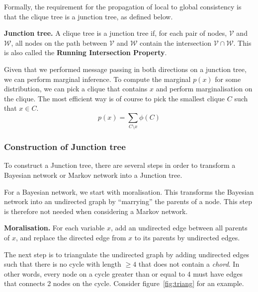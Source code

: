 \documentclass{article}
\begin{document}
Formally, the requirement for the propagation of local to global consistency is that the clique tree is a junction tree, as defined below.
\\
\begin{theorem}
    \textbf{Junction tree.} A clique tree is a junction tree if, for each pair of nodes, $\mathcal{V}$ and $\mathcal{W}$, all nodes on the path between $\mathcal{V}$ and $\mathcal{W}$ contain the intersection $\mathcal{V} \cap \mathcal{W}$. This is also called the \textbf{Running Intersection Property}. 
\end{theorem}

\noindent Given that we performed message passing in both directions on a junction tree, we can perform marginal inference. To compute the marginal $p(x)$ for some distribution, we can pick a clique that contains $x$ and perform marginalisation on the clique. The most efficient way is of course to pick the smallest clique $C$ such that $x \in C$. 
$$
    p(x) = \sum_{C \text{\textbackslash} x} \phi(C) 
$$

\subsubsection{Construction of Junction tree}

To construct a Junction tree, there are several steps in order to transform a Bayesian network or Markov network into a Junction tree. 

For a Bayesian network, we start with moralisation. This transforms the Bayesian network into an undirected graph by ``marrying'' the parents of a node. This step is therefore not needed when considering a Markov network. 
\\
\begin{theorem}
    \textbf{Moralisation.} For each variable $x$, add an undirected edge between all parents of $x$, and replace the directed edge from $x$ to its parents by undirected edges. 
\end{theorem}

\noindent The next step is to triangulate the undirected graph by adding undirected edges such that there is no cycle with length $\geq 4$ that does not contain a \textit{chord}. In other words, every node on a cycle greater than or equal to 4 must have edges that connects 2 nodes on the cycle. Consider figure~\ref{fig:triang} for an example. 
\end{document}
